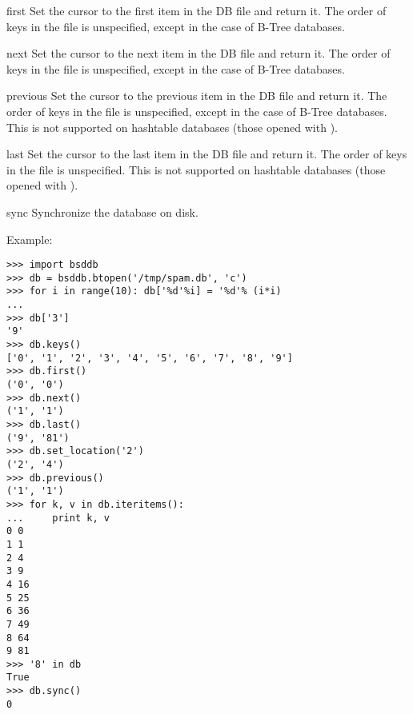 \begin{methoddesc}{first}{}
Set the cursor to the first item in the DB file and return it.  The order of 
keys in the file is unspecified, except in the case of B-Tree databases.
\end{methoddesc}

\begin{methoddesc}{next}{}
Set the cursor to the next item in the DB file and return it.  The order of 
keys in the file is unspecified, except in the case of B-Tree databases.
\end{methoddesc}

\begin{methoddesc}{previous}{}
Set the cursor to the previous item in the DB file and return it.  The
order of keys in the file is unspecified, except in the case of B-Tree
databases.  This is not supported on hashtable databases (those opened
with ).
\end{methoddesc}

\begin{methoddesc}{last}{}
Set the cursor to the last item in the DB file and return it.  The
order of keys in the file is unspecified.  This is not supported on
hashtable databases (those opened with ).
\end{methoddesc}

\begin{methoddesc}{sync}{}
Synchronize the database on disk.
\end{methoddesc}

Example:

\begin{verbatim}
>>> import bsddb
>>> db = bsddb.btopen('/tmp/spam.db', 'c')
>>> for i in range(10): db['%d'%i] = '%d'% (i*i)
... 
>>> db['3']
'9'
>>> db.keys()
['0', '1', '2', '3', '4', '5', '6', '7', '8', '9']
>>> db.first()
('0', '0')
>>> db.next()
('1', '1')
>>> db.last()
('9', '81')
>>> db.set_location('2')
('2', '4')
>>> db.previous() 
('1', '1')
>>> for k, v in db.iteritems():
...     print k, v
0 0
1 1
2 4
3 9
4 16
5 25
6 36
7 49
8 64
9 81
>>> '8' in db
True
>>> db.sync()
0
\end{verbatim}
